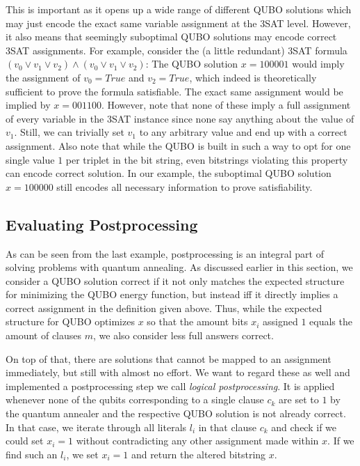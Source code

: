 This is important as it opens up a wide range of different QUBO solutions which may just encode the exact same variable assignment at the 3SAT level. However, it also means that seemingly suboptimal QUBO solutions may encode correct 3SAT assignments. For example, consider the (a little redundant) 3SAT formula $(v_0 \lor v_1 \lor v_2) \land (v_0 \lor v_1 \lor v_2)$: The QUBO solution $x = 100001$ would imply the assignment of $v_0 = \textit{True}$ and $v_2 = \textit{True}$, which indeed is theoretically sufficient to prove the formula satisfiable. The exact same assignment would be implied by $x = 001100$. However, note that none of these imply a full assignment of every variable in the 3SAT instance since none say anything about the value of $v_1$. Still, we can trivially set $v_1$ to any arbitrary value and end up with a correct assignment. Also note that while the QUBO is built in such a way to opt for one single value $1$ per triplet in the bit string, even bitstrings violating this property can encode correct solution. In our example, the suboptimal QUBO solution $x=100000$ still encodes all necessary information to prove satisfiability.

\subsection{Evaluating Postprocessing}

As can be seen from the last example, postprocessing is an integral part of solving problems with quantum annealing. As discussed earlier in this section, we consider a QUBO solution correct if it not only matches the expected structure for minimizing the QUBO energy function, but instead iff it directly implies a correct assignment in the definition given above. Thus, while the expected structure for QUBO optimizes $x$ so that the amount bits $x_i$ assigned $1$ equals the amount of clauses $m$, we also consider less full answers correct.

On top of that, there are solutions that cannot be mapped to an assignment immediately, but still with almost no effort. We want to regard these as well and implemented a postprocessing step we call \emph{logical postprocessing}. It is applied whenever none of the qubits corresponding to a single clause $c_k$ are set to $1$ by the quantum annealer and the respective QUBO solution is not already correct. In that case, we iterate through all literals $l_i$ in that clause $c_k$ and check if we could set $x_i = 1$ without contradicting any other assignment made within $x$. If we find such an $l_i$, we set $x_i = 1$ and return the altered bitstring $x$.

